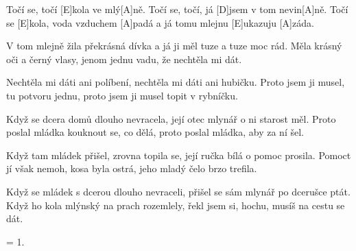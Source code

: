 
\sloka
[A]Točí se, točí [E]kola ve mlý[A]ně.
Točí se, točí, já [D]jsem v tom nevin[A]ně.
Točí se [E]kola, voda vzduchem [A]padá
a já tomu mlejnu [E]ukazuju [A]záda.

\sloka
V tom mlejně žila překrásná dívka
a já ji měl tuze a tuze moc rád.
Měla krásný oči a černý vlasy,
jenom jednu vadu, že nechtěla mi dát.

\sloka
Nechtěla mi dáti ani políbení,
nechtěla mi dáti ani hubičku.
Proto jsem ji musel, tu potvoru jednu,
proto jsem ji musel topit v rybníčku.

\sloka
Když se dcera domů dlouho nevracela,
její otec mlynář o ni starost měl.
Proto poslal mládka kouknout se, co dělá,
proto poslal mládka, aby za ní šel.

\sloka
Když tam mládek přišel, zrovna topila se,
její ručka bílá o pomoc prosila.
Pomoct jí však nemoh, kosa byla ostrá,
jeho mladý čelo brzo trefila.

\sloka
Když se mládek s dcerou dlouho nevraceli,
přišel se sám mlynář po dcerušce ptát.
Když ho kola mlýnský na prach rozemlely,
řekl jsem si, hochu, musíš na cestu se dát.

\sloka
= 1.
